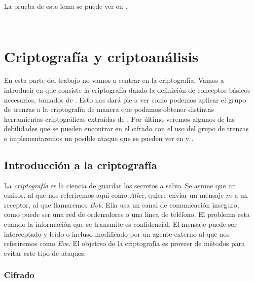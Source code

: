 \documentclass[12pt]{article}
\theoremstyle{definition}
\begin{document}
La prueba de este lema se puede ver en \cite{Alg}.






























\ 
\newline
\newline
\section{Criptografía y criptoanálisis}

En esta parte del trabajo no vamos a centrar en la criptografía. Vamos a introducir en que consiste la criptografía dando la definición de conceptos básicos necesarios, tomados de \cite{in_cr}. Esto nos dará pie a ver como podemos aplicar el grupo de trenzas a la criptografía de manera que podamos obtener distintas herramientas criptográficas extraídas de \cite{Deh}. Por último veremos algunos de las debilidades que se pueden encontrar en el cifrado con el uso del grupo de trenzas e implementaremos un posible ataque que se pueden ver en \cite{Att} y \cite{in_cr}.

\subsection{Introducción a la criptografía}

La \textit{criptografía} es la ciencia de guardar los secretos a salvo. Se asume que un emisor, al que nos referiremos aquí como \textit{Alice}, quiere enviar un mensaje $m$ a un receptor, al que llamaremos \textit{Bob}. Ella usa un canal de comunicación inseguro, como puede ser una red de ordenadores o una linea de teléfono. El problema esta cuando la información que se transmite es confidencial. El mensaje puede ser interceptado y leído o incluso modificado por un agente externo al que nos referiremos como \textit{Eve}. El objetivo de la criptografía es proveer de métodos para evitar este tipo de ataques.

\subsubsection{Cifrado}
\end{document}
